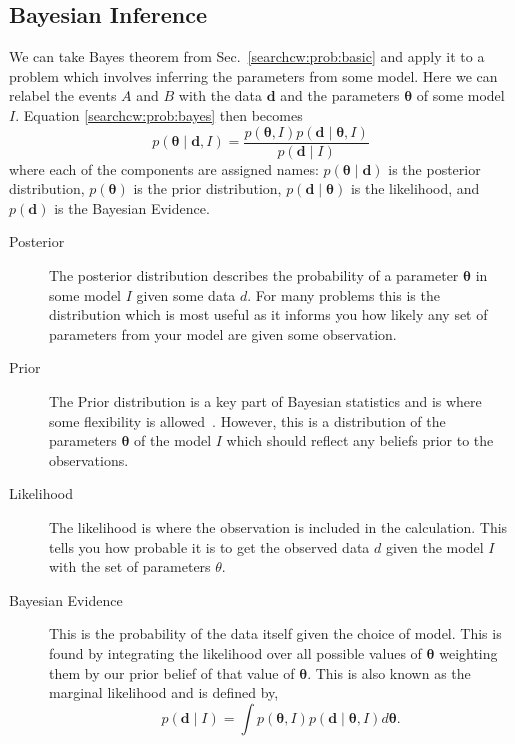 \subsection{\label{searchcw:bayes}Bayesian Inference}

We can take Bayes theorem from Sec.~\ref{searchcw:prob:basic} and apply it to a
problem which involves inferring the parameters from some model. Here we can
relabel the events $A$ and $B$ with the data ${\bm d}$ and the parameters ${\bm
\theta}$ of some model $I$.  Equation \ref{searchcw:prob:bayes} then becomes
%
\begin{equation}
\label{searchcw:bayes:bayes}
p({\bm \theta} \mid {\bm d}, I) = \frac{p({\bm \theta}, I)p({\bm d} \mid {\bm \theta}, I)}{p({\bm d} \mid I)}
\end{equation}
%
where each of the components are assigned names: $p({\bm \theta} \mid {\bm d})$
is the posterior distribution, $p({\bm \theta})$ is the prior distribution,
$p({\bm d} \mid {\bm \theta})$ is the likelihood, and $p({\bm d})$ is the
Bayesian Evidence.

\begin{description}
	\item [Posterior]
        The posterior distribution describes the probability of a parameter
${\bm \theta}$ in some model $I$ given some data $d$. For many problems this is
the distribution which is most useful as it informs you how likely any set of
parameters from your model are given some observation.
	
        \item [Prior] The Prior distribution is a key part of Bayesian
statistics and is where some flexibility is allowed~. However, this is a distribution of the parameters ${\bm \theta}$ of the model $I$ which should reflect any beliefs prior to the observations.
	
        \item [Likelihood] The likelihood is where the observation is included
in the calculation. This tells you how probable it is to get the observed data
$d$ given the model $I$ with the set of parameters $\theta$. 
	
        \item [Bayesian Evidence] This is the probability of the data itself
given the choice of model. This is found by integrating the likelihood over all
possible values of ${\bm \theta}$ weighting them by our prior belief of that
value of ${\bm \theta}$. This is also known as the marginal
likelihood and is defined by,
        \begin{equation} \label{searchcw:bayes:evidence} 
            p({\bm d} \mid I) = \int p({\bm \theta}, I)p({\bm d} \mid {\bm \theta}, I) d{\bm \theta}.
        \end{equation} 
\end{description}

